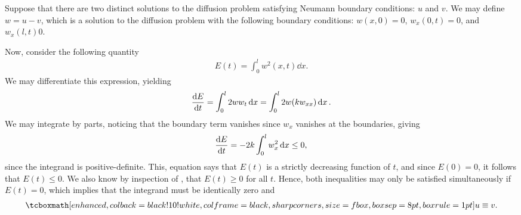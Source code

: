 Suppose that there are two distinct solutions to the diffusion problem satisfying Neumann boundary conditions: $u$ and $v$.
We may define $w = u - v$, which is a solution to the diffusion problem with the following boundary conditions: $w(x,0) = 0$, $w_{x}(0,t) = 0$, and $w_{x}(l,t)0$.

Now, consider the following quantity
\begin{eqnarray}
    \label{eq:energy}
    E(t) = \int_{0}^{l} w^2(x,t) \dd{x}
.\end{eqnarray}
We may differentiate this expression, yielding
\begin{eqnarray}
    \label{eq:diff-energy}
    \dv{E}{t} = \int_{0}^{l} 2ww_{t} \dd{x} = \int_{0}^{l} 2w(kw_{xx}) \dd{x} 
.\end{eqnarray}
We may integrate by parts, noticing that the boundary term vanishes since $w_{x}$ vanishes at the boundaries, giving
\begin{eqnarray}
    \label{eq:diff-energy-int-by-parts}
    \dv{E}{t} = -2k\int_{0}^{l} w_{x}^2 \dd{x} \leq 0
,\end{eqnarray}
since the integrand is positive-definite.
This, equation says that $E(t)$ is a strictly decreasing function of $t$, and since $E(0) = 0$, it follows that $E(t) \leq 0$.
We also know by inspection of , that $E(t) \geq 0$ for all $t$.
Hence, both inequalities may only be satisfied simultaneously if $E(t) = 0$, which implies that the integrand must be identically zero and 
\begin{eqnarray}
    \label{eq:uniqueness}
    \eqbox{u \equiv v}
.\end{eqnarray}









